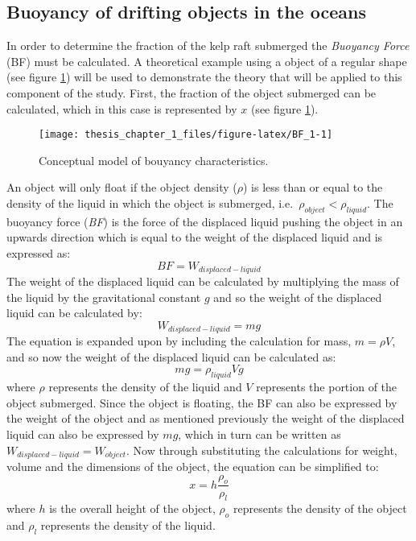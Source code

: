 \documentclass[
]{article}
\begin{document}
\hypertarget{buoyancy-of-drifting-objects-in-the-oceans}{%
\subsection{Buoyancy of drifting objects in the
oceans}\label{buoyancy-of-drifting-objects-in-the-oceans}}

In order to determine the fraction of the kelp raft submerged the
\emph{Buoyancy Force} (BF) must be calculated. A theoretical example
using a object of a regular shape (see figure \ref{fig:BF_1}) will be
used to demonstrate the theory that will be applied to this component of
the study. First, the fraction of the object submerged can be
calculated, which in this case is represented by \(x\) (see figure
\ref{fig:BF_1}).

\begin{figure}

{\centering \texttt{[image: thesis\_chapter\_1\_files/figure-latex/BF\_1-1]} 

}

\caption{\label{fig:BF_1}Conceptual model of bouyancy characteristics.}\label{fig:BF_1}
\end{figure}

An object will only float if the object density (\(\rho\)) is less than
or equal to the density of the liquid in which the object is submerged,
i.e.~\(\rho_{object} < \rho_{liquid}\). The buoyancy force (\emph{BF})
is the force of the displaced liquid pushing the object in an upwards
direction which is equal to the weight of the displaced liquid and is
expressed as: \[BF = W_{displaced-liquid}\] The weight of the displaced
liquid can be calculated by multiplying the mass of the liquid by the
gravitational constant \(g\) and so the weight of the displaced liquid
can be calculated by: \[W_{displaced-liquid} = mg\] The equation is
expanded upon by including the calculation for mass, \(m = \rho V\), and
so now the weight of the displaced liquid can be calculated as:
\[mg = \rho_{liquid} V g\] where \(\rho\) represents the density of the
liquid and \(V\) represents the portion of the object submerged. Since
the object is floating, the BF can also be expressed by the weight of
the object and as mentioned previously the weight of the displaced
liquid can also be expressed by \(mg\), which in turn can be written as
\(W_{displaced-liquid} = W_{object}\). Now through substituting the
calculations for weight, volume and the dimensions of the object, the
equation can be simplified to:
\[x= h\displaystyle\frac{\rho_o}{\rho_l}\] where \(h\) is the overall
height of the object, \(\rho_o\) represents the density of the object
and \(\rho_l\) represents the density of the liquid.
\end{document}
